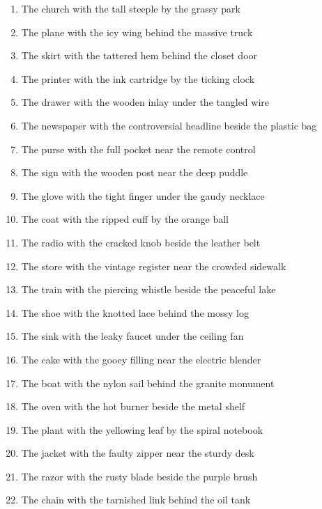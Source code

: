 \documentclass[12pt,titlepage]{article}
\begin{document}
\begin{enumerate}
\item The church with the tall steeple by the grassy park
    
\item The plane with the icy wing behind the massive truck
    
\item The skirt with the tattered hem behind the closet door
    
\item The printer with the ink cartridge by the ticking clock
    
\item The drawer with the wooden inlay under the tangled wire
    
\item The newspaper with the controversial headline beside the plastic bag
    
\item The purse with the full pocket near the remote control
    
\item The sign with the wooden post near the deep puddle
    
\item The glove with the tight finger under the gaudy necklace
    
\item The coat with the ripped cuff by the orange ball
    
\item The radio with the cracked knob beside the leather belt
    
\item The store with the vintage register near the crowded sidewalk
    
\item The train with the piercing whistle beside the peaceful lake
    
\item The shoe with the knotted lace behind the mossy log
    
\item The sink with the leaky faucet under the ceiling fan
    
\item The cake with the gooey filling near the electric blender
    
\item The boat with the nylon sail behind the granite monument
    
\item The oven with the hot burner beside the metal shelf
    
\item The plant with the yellowing leaf by the spiral notebook
    
\item The jacket with the faulty zipper near the sturdy desk
    
\item The razor with the rusty blade beside the purple brush
    
\item The chain with the tarnished link behind the oil tank

\end{enumerate}
\end{document}
